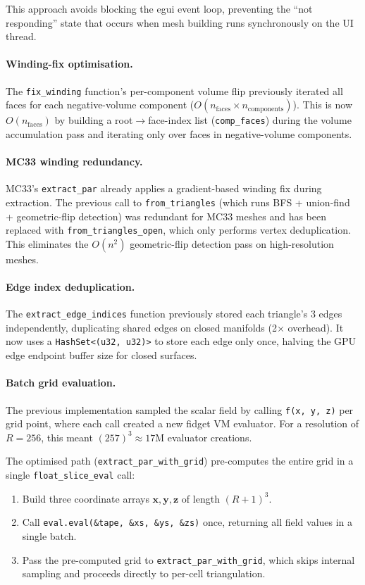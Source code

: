 \documentclass[11pt]{article}
\begin{document}
This approach avoids blocking the egui event loop, preventing the
``not responding'' state that occurs when mesh building runs
synchronously on the UI thread.

\paragraph{Winding-fix optimisation.}
The \texttt{fix\_winding} function's per-component volume flip
previously iterated all faces for each negative-volume component
($O(n_{\text{faces}} \times n_{\text{components}})$).  This is now
$O(n_{\text{faces}})$ by building a root$\to$face-index list
(\texttt{comp\_faces}) during the volume accumulation pass and
iterating only over faces in negative-volume components.

\paragraph{MC33 winding redundancy.}
MC33's \texttt{extract\_par} already applies a gradient-based winding
fix during extraction.  The previous call to \texttt{from\_triangles}
(which runs BFS + union-find + geometric-flip detection) was
redundant for MC33 meshes and has been replaced with
\texttt{from\_triangles\_open}, which only performs vertex
deduplication.  This eliminates the $O(n^2)$ geometric-flip detection
pass on high-resolution meshes.

\paragraph{Edge index deduplication.}
The \texttt{extract\_edge\_indices} function previously stored each
triangle's 3 edges independently, duplicating shared edges on closed
manifolds (2$\times$ overhead).  It now uses a
\texttt{HashSet<(u32, u32)>} to store each edge only once, halving
the GPU edge endpoint buffer size for closed surfaces.

\paragraph{Batch grid evaluation.}
The previous implementation sampled the scalar field by calling
\texttt{f(x, y, z)} per grid point, where each call created a new
fidget VM evaluator.  For a resolution of $R = 256$, this meant
$(257)^3 \approx 17\text{M}$ evaluator creations.

The optimised path (\texttt{extract\_par\_with\_grid}) pre-computes
the entire grid in a single \texttt{float\_slice\_eval} call:
\begin{enumerate}[leftmargin=2em]
  \item Build three coordinate arrays $\mathbf{x}, \mathbf{y},
        \mathbf{z}$ of length $(R+1)^3$.
  \item Call \texttt{eval.eval(\&tape, \&xs, \&ys, \&zs)} once,
        returning all field values in a single batch.
  \item Pass the pre-computed grid to \texttt{extract\_par\_with\_grid},
        which skips internal sampling and proceeds directly to
        per-cell triangulation.
\end{enumerate}
\end{document}
